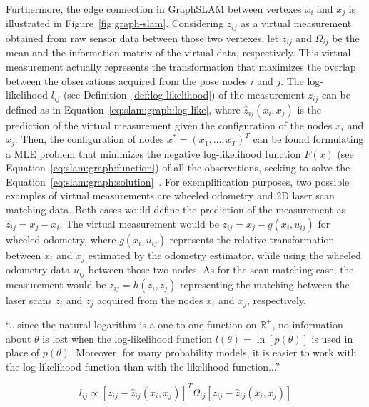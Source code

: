 Furthermore, the edge connection in GraphSLAM between vertexes $x_i$ and $x_j$ is illustrated in Figure~\ref{fig:graph-slam}.
Considering $z_{ij}$ as a virtual measurement obtained from raw sensor data between those two vertexes, let $\overline{z}_{ij}$ and $\Omega_{ij}$ be the mean and the information matrix of the virtual data, respectively. This virtual measurement actually represents the transformation that maximizes the overlap between the observations acquired from the pose nodes $i$ and $j$.
The log-likelihood $l_{ij}$ (see Definition~\ref{def:log-likelihood}) of the measurement $z_{ij}$ can be defined as in Equation~\ref{eq:slam:graph:log-like}, where $\hat{z}_{ij}\left(x_i,x_j\right)$ is the prediction of the virtual measurement given the configuration of the nodes $x_i$ and $x_j$.
Then, the configuration of nodes $x^*=\left(x_1,\dots,x_T\right)^T$ can be found formulating a \gls{MLE} problem that minimizes the negative log-likelihood function $F\left(x\right)$ (see Equation~\ref{eq:slam:graph:function}) of all the observations, seeking to solve the Equation~\ref{eq:slam:graph:solution}~\cite{slam:graph:tutorial}.
For exemplification purposes, two possible examples of virtual measurements are wheeled odometry and 2D laser scan matching data. Both cases would define the prediction of the measurement as $\hat{z}_{ij}=x_j-x_i$.
The virtual measurement would be $z_{ij}=x_j - g\left(x_i,u_{ij}\right)$ for wheeled odometry, where $g\left(x_i,u_{ij}\right)$ represents the relative transformation between $x_i$ and $x_j$ estimated by the odometry estimator, while using the wheeled odometry data $u_{ij}$ between those two nodes.
As for the scan matching case, the measurement would be $z_{ij}=h\left(z_i,z_j\right)$ representing the matching between the laser scans $z_i$ and $z_j$ acquired from the nodes $x_i$ and $x_j$, respectively.

\begin{definition}\label{def:log-likelihood}
``...since the natural logarithm is a one-to-one function on $\mathbb{R}^+$, no information about $\theta$ is lost when the log-likelihood function $l\left(\theta\right)=\ln\left[p\left(\theta\right)\right]$ is used in place of $p\left(\theta\right)$.
Moreover, for many probability models, it is easier to work with the log-likelihood function than with the likelihood function...''
\end{definition}

\begin{equation}\label{eq:slam:graph:log-like}
l_{ij} \propto \left[z_{ij}-\hat{z}_{ij}\left(x_i,x_j\right)\right]^T \Omega_{ij} \left[z_{ij}-\hat{z}_{ij}\left(x_i,x_j\right)\right]
\end{equation}

